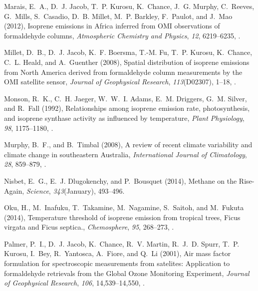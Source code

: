 \documentclass[draft,linenumbers]{AGUJournal}
\begin{document}
\begin{thebibliography}{51}
Marais, E.~A., D.~J. Jacob, T.~P. Kurosu, K.~Chance, J.~G. Murphy, C.~Reeves,
  G.~Mills, S.~Casadio, D.~B. Millet, M.~P. Barkley, F.~Paulot, and J.~Mao
  (2012), {Isoprene emissions in Africa inferred from OMI observations of
  formaldehyde columns}, \textit{Atmospheric Chemistry and Physics},
  \textit{12}, 6219--6235, .

Millet, D.~B., D.~J. Jacob, K.~F. Boersma, T.-M. Fu, T.~P. Kurosu, K.~Chance,
  C.~L. Heald, and A.~Guenther (2008), {Spatial distribution of isoprene
  emissions from North America derived from formaldehyde column measurements by
  the OMI satellite sensor}, \textit{Journal of Geophysical Research},
  \textit{113}(D02307), 1--18, .

Monson, R.~K., C.~H. Jaeger, W.~W.~I. Adams, E.~M. Driggers, G.~M. Silver, and
  R.~Fall (1992), {Relationships among isoprene emission rate, photosynthesis,
  and isoprene synthase activity as influenced by temperature}, \textit{Plant
  Physiology}, \textit{98}, 1175--1180, .

Murphy, B.~F., and B.~Timbal (2008), {A review of recent climate variability
  and climate change in southeastern Australia}, \textit{International Journal
  of Climatology}, \textit{28}, 859--879, .

Nisbet, E.~G., E.~J. Dlugokenchy, and P.~Bousquet (2014), {Methane on the
  Rise-Again}, \textit{Science}, \textit{343}(January), 493--496.

Oku, H., M.~Inafuku, T.~Takamine, M.~Nagamine, S.~Saitoh, and M.~Fukuta (2014),
  {Temperature threshold of isoprene emission from tropical trees, Ficus
  virgata and Ficus septica.}, \textit{Chemosphere}, \textit{95}, 268--273,
  .

Palmer, P.~I., D.~J. Jacob, K.~Chance, R.~V. Martin, R.~J.~D. Spurr, T.~P.
  Kurosu, I.~Bey, R.~Yantosca, A.~Fiore, and Q.~Li (2001), {Air mass factor
  formulation for spectroscopic measurements from satelites: Application to
  formaldehyde retrievals from the Global Ozone Monitoring Experiment},
  \textit{Journal of Geophysical Research}, \textit{106}, 14,539--14,550,
  .


\end{thebibliography}
\end{document}
